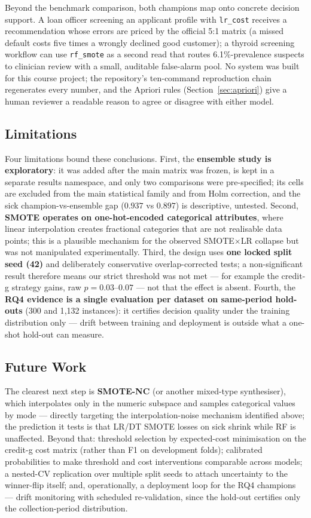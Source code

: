 Beyond the benchmark comparison, both champions map onto concrete decision support. A loan officer screening an applicant profile with \texttt{lr\_cost} receives a recommendation whose errors are priced by the official 5:1 matrix (a missed default costs five times a wrongly declined good customer); a thyroid screening workflow can use \texttt{rf\_smote} as a second read that routes 6.1\%-prevalence suspects to clinician review with a small, auditable false-alarm pool. No system was built for this course project; the repository's ten-command reproduction chain regenerates every number, and the Apriori rules (Section~\ref{sec:apriori}) give a human reviewer a readable reason to agree or disagree with either model.

\subsection{Limitations}

Four limitations bound these conclusions. First, the \textbf{ensemble study is exploratory}: it was added after the main matrix was frozen, is kept in a separate results namespace, and only two comparisons were pre-specified; its cells are excluded from the main statistical family and from Holm correction, and the sick champion-vs-ensemble gap ($0.937$ vs $0.897$) is descriptive, untested. Second, \textbf{SMOTE operates on one-hot-encoded categorical attributes}, where linear interpolation creates fractional categories that are not realisable data points; this is a plausible mechanism for the observed SMOTE$\times$LR collapse but was not manipulated experimentally. Third, the design uses \textbf{one locked split seed (42)} and deliberately conservative overlap-corrected tests; a non-significant result therefore means our strict threshold was not met --- for example the credit-g strategy gains, raw $p=0.03$--$0.07$ --- not that the effect is absent. Fourth, the \textbf{RQ4 evidence is a single evaluation per dataset on same-period hold-outs} (300 and 1{,}132 instances): it certifies decision quality under the training distribution only --- drift between training and deployment is outside what a one-shot hold-out can measure.

\subsection{Future Work}

The clearest next step is \textbf{SMOTE-NC} (or another mixed-type synthesiser), which interpolates only in the numeric subspace and samples categorical values by mode --- directly targeting the interpolation-noise mechanism identified above; the prediction it tests is that LR/DT SMOTE losses on sick shrink while RF is unaffected. Beyond that: threshold selection by expected-cost minimisation on the credit-g cost matrix (rather than F1 on development folds); calibrated probabilities to make threshold and cost interventions comparable across models; a nested-CV replication over multiple split seeds to attach uncertainty to the winner-flip itself; and, operationally, a deployment loop for the RQ4 champions --- drift monitoring with scheduled re-validation, since the hold-out certifies only the collection-period distribution.
